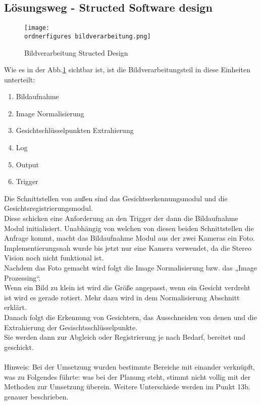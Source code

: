 \subsection{Lösungsweg - Structed Software design} 
  

\begin{figure}
	\centering
	\texttt{[image: \\ordnerfigures bildverarbeitung.png]}
	\caption{ Bildverarbeitung Structed Design}
	\label{fig:bildverarbeitung}
\end{figure}

Wie es in der Abb.\ref{fig:bildverarbeitung} sichtbar ist, ist die Bildverarbeitungsteil in diese Einheiten unterteilt:
\begin{enumerate}
	\item Bildaufnahme
	\item Image Normalisierung
	\item Gesichtschlüsselpunkten Extrahierung
	\item Log
	\item Output 
	\item Trigger 
\end{enumerate}

Die Schnittstellen von außen sind das Gesichtserkennungsmodul und die Gesichtsregistrierungsmodul. \\ 
Diese schicken eine Anforderung an den Trigger der dann die Bildaufnahme Modul initialisiert. Unabhängig von welchen von diesen beiden Schnittstellen die Anfrage kommt, macht das Bildaufnahme Modul aus der zwei Kameras ein Foto. 
\\
Implementierungsnah wurde bis jetzt nur eine Kamera verwendet, da die Stereo Vision noch nicht funktional ist. \\
Nachdem das Foto gemacht wird folgt die Image Normalisierung bzw. das „Image Prozessing“. \\
Wenn ein Bild zu klein ist wird die Größe angepasst, wenn ein Gesicht verdreht ist wird es gerade rotiert. Mehr dazu wird in dem Normalisierung Abschnitt erklärt.\\
Danach folgt die Erkennung von Gesichtern, das Ausschneiden von denen und die Extrahierung der Gesischtsschlüsselpunkte.\\ Sie werden dann zur Abgleich oder Registrierung je nach Bedarf, bereitet und geschickt. \\
\\

Hinweis: Bei der Umsetzung wurden bestimmte Bereiche mit einander verknüpft, was zu Folgendes führte: was bei der Planung steht, stimmt nicht vollig mit der Methoden zur Umsetzung überein. Weitere Unterschiede werden im Punkt 13b. genauer beschrieben.  \\
